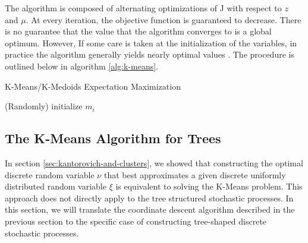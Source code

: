 The algorithm is composed of alternating optimizations of J with respect to $z$ and $\mu$.
At every iteration, the objective function is guaranteed to decrease.
There is no guarantee that the value that the algorithm converges to is a global optimum.
However, If some care is taken at the initialization of the variables, in practice the algorithm generally yields nearly optimal values \cite{Arthur2006}.
The procedure is outlined below in algorithm \ref{alg:k-means}.
\begin{algorithm}
  \label{alg:k-means}
  \caption{K-Means/K-Medoids Expectation Maximization}
  
  (Randomly) initialize $m_i$\;
\end{algorithm}
\subsection{The K-Means Algorithm for Trees}
\label{sec:k-means-algorithm-trees}
In section \ref{sec:kantorovich-and-clusters}, we showed that constructing the optimal discrete random variable $\nu$ that best approximates a given discrete uniformly distributed random variable $\xi$ is equivalent to solving the K-Means problem.
This approach does not directly apply to the tree structured stochastic processes.
In this section, we will translate the coordinate descent algorithm described in the previous section to the specific case of constructing tree-shaped discrete stochastic processes.
%
